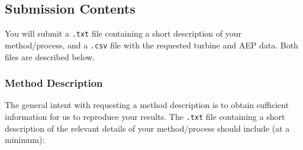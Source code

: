 \documentclass[12pt]{article}
\begin{document}
\subsection{Submission Contents}\label{Sec:RepResults}
You will submit a \texttt{.txt} file containing a short description of your method/process, and a \texttt{.csv} file with the requested turbine and AEP data. Both files are described below.

        \subsubsection{Method Description}\label{sec:MethodDesc}
        	The general intent with requesting a method description is to obtain sufficient information for us to reproduce your results. The \texttt{.txt} file containing a short description of the relevant details of your method/process should include (at a minimum):
\end{document}
